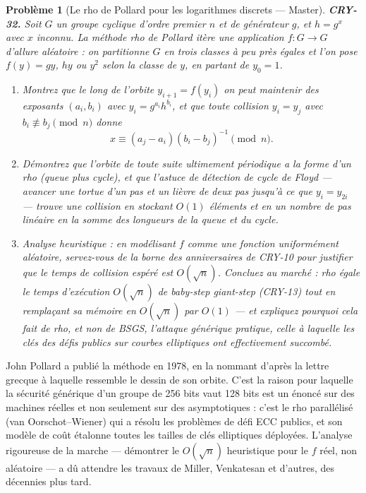 \documentclass[11pt]{article}
\newtheorem{problem}{Problème}
\begin{document}
\begin{problem}[{Le rho de Pollard pour les logarithmes discrets --- Master}]
\textbf{CRY-32.} Soit $G$ un groupe cyclique d'ordre premier $n$ et de générateur
$g$, et $h = g^x$ avec $x$ inconnu. La méthode rho de Pollard itère une
application $f: G \to G$ \og{} d'allure aléatoire \fg{} : on partitionne $G$ en trois classes à
peu près égales et l'on pose $f(y) = gy$, $hy$ ou $y^2$ selon la classe de
$y$, en partant de $y_0 = 1$.
\begin{enumerate}
\item[(a)] Montrez que le long de l'orbite $y_{i+1} = f(y_i)$ on peut maintenir des exposants
$(a_i, b_i)$ avec $y_i = g^{a_i} h^{b_i}$, et que toute collision
$y_i = y_j$ avec $b_i \not\equiv b_j \pmod n$ donne
\[ x \equiv (a_j - a_i)(b_i - b_j)^{-1} \pmod n . \]
\item[(b)] Démontrez que l'orbite de toute suite ultimement périodique a la forme d'un \og{} rho \fg{}
(queue plus cycle), et que l'astuce de détection de cycle de Floyd --- avancer une tortue d'un
pas et un lièvre de deux pas jusqu'à ce que $y_i = y_{2i}$ --- trouve une collision en
stockant $O(1)$ éléments et en un nombre de pas linéaire en la somme des longueurs de la
queue et du cycle.
\item[(c)] Analyse heuristique : en modélisant $f$ comme une fonction uniformément aléatoire,
servez-vous de la borne des anniversaires de CRY-10 pour justifier que le temps de collision
espéré est $O(\sqrt n)$. Concluez au marché : rho égale le temps d'exécution
$O(\sqrt n)$ de baby-step giant-step (CRY-13) tout en remplaçant sa mémoire en
$O(\sqrt n)$ par $O(1)$ --- et expliquez pourquoi cela fait de rho, et non de BSGS,
l'attaque générique pratique, celle à laquelle les clés des défis publics sur courbes
elliptiques ont effectivement succombé.
\end{enumerate}

\end{problem}

\noindent John Pollard a publié la méthode en 1978, en la nommant d'après la lettre
grecque à laquelle ressemble le dessin de son orbite. C'est la raison pour laquelle \og{} la
sécurité générique d'un groupe de 256 bits vaut 128 bits \fg{} est un énoncé sur des machines
réelles et non seulement sur des asymptotiques : c'est le rho parallélisé
(van Oorschot--Wiener) qui a résolu les problèmes de défi ECC publics, et son modèle de coût
étalonne toutes les tailles de clés elliptiques déployées. L'analyse rigoureuse de la marche
--- démontrer le $O(\sqrt n)$ heuristique pour le $f$ réel, non aléatoire --- a dû attendre
les travaux de Miller, Venkatesan et d'autres, des décennies plus tard.
\end{document}
